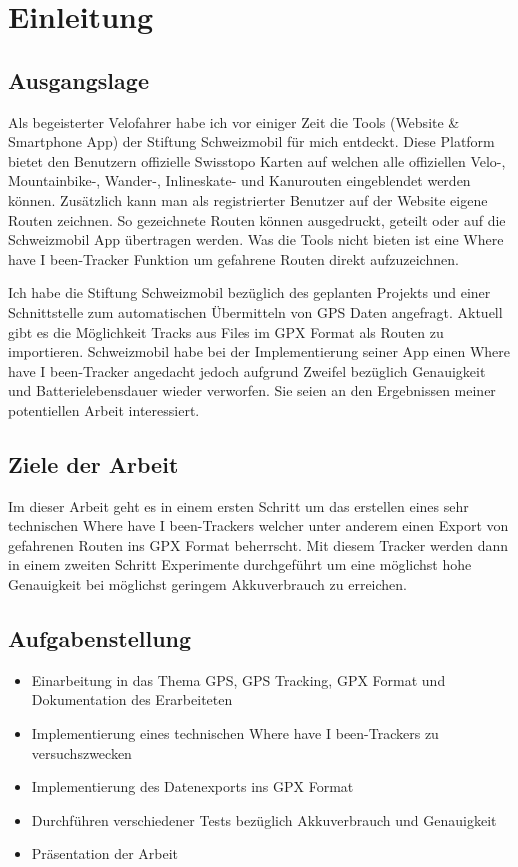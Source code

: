 \section{Einleitung}
\subsection{Ausgangslage}
Als begeisterter Velofahrer habe ich vor einiger Zeit die Tools (Website \& Smartphone App) der Stiftung Schweizmobil für mich entdeckt. Diese Platform bietet den Benutzern offizielle Swisstopo Karten auf welchen alle offiziellen Velo-, Mountainbike-, Wander-, Inlineskate- und Kanurouten eingeblendet werden können. Zusätzlich kann man als registrierter Benutzer auf der Website eigene Routen zeichnen. So gezeichnete Routen können ausgedruckt, geteilt oder auf die Schweizmobil App übertragen werden. Was die Tools nicht bieten ist eine \flqq Where have I been\frqq-Tracker Funktion um gefahrene Routen direkt aufzuzeichnen.

Ich habe die Stiftung Schweizmobil bezüglich des geplanten Projekts und einer Schnittstelle zum automatischen Übermitteln von GPS Daten angefragt. Aktuell gibt es die Möglichkeit Tracks aus Files im GPX Format als Routen zu importieren. Schweizmobil habe bei der Implementierung seiner App einen \flqq Where have I been\frqq-Tracker angedacht jedoch aufgrund Zweifel bezüglich Genauigkeit und Batterielebensdauer wieder verworfen. Sie seien an den Ergebnissen meiner potentiellen Arbeit interessiert.

\subsection{Ziele der Arbeit}
Im dieser Arbeit geht es in einem ersten Schritt um das erstellen eines sehr technischen \flqq Where have I been\frqq-Trackers welcher unter anderem einen Export von gefahrenen Routen ins GPX Format beherrscht. Mit diesem Tracker werden dann in einem zweiten Schritt Experimente durchgeführt um eine möglichst hohe Genauigkeit bei möglichst geringem Akkuverbrauch zu erreichen.

\subsection{Aufgabenstellung}
\begin{itemize}
\item Einarbeitung in das Thema GPS, GPS Tracking, GPX Format und Dokumentation des Erarbeiteten
\item Implementierung eines technischen \flqq Where have I been\frqq-Trackers zu versuchszwecken
\item Implementierung des Datenexports ins GPX Format
\item Durchführen verschiedener Tests bezüglich Akkuverbrauch und Genauigkeit
\item Präsentation der Arbeit
\end{itemize}

